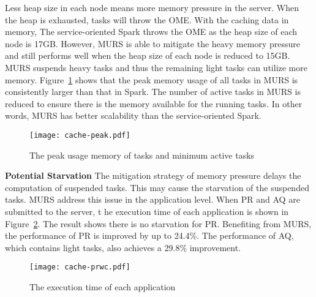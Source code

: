 Less heap size in each node means more memory pressure in the server. When the heap is exhausted, tasks will throw the OME. With the caching data in memory, The service-oriented Spark throws the OME as the heap size of each node is 17GB. However, MURS is able to mitigate the heavy memory pressure and still performs well when the heap size of each node is reduced to 15GB. MURS suspends heavy tasks and  thus the remaining light tasks can utilize more memory. Figure~\ref{fig:cache-peak} shows that the peak memory usage of all tasks in MURS is consistently larger than that in Spark. The number of active tasks in MURS is reduced to ensure there is the memory available for the running tasks. In other words, MURS has better scalability than the service-oriented Spark.

\begin{figure}[!t]
\centering
\texttt{[image: cache-peak.pdf]}
\vspace{-2mm}
\caption{The peak usage memory of tasks and minimum active tasks}
\vspace{-4mm}
\label{fig:cache-peak}
\end{figure}


\textbf{Potential Starvation} The mitigation strategy of memory pressure delays the computation of suspended tasks. This may cause the starvation of the suspended tasks. MURS address this issue in the application level. 
When PR and AQ are submitted to the server, t
he execution time of each application is shown in Figure~\ref{fig:cache-prwc}. The result shows there is no starvation for PR. Benefiting from MURS, the performance of PR is improved by up to 24.4\%. The performance of AQ, which contains light tasks, also achieves a 29.8\% improvement. 

\begin{figure}[!t]
\centering
\texttt{[image: cache-prwc.pdf]}
\vspace{-2mm}
\caption{The execution time of each application}
\vspace{-2mm}
\label{fig:cache-prwc}
\end{figure}

